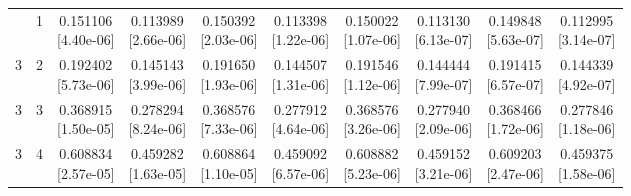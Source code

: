 \documentclass[12pt,letterpaper]{article}
\theoremstyle{plain}
\theoremstyle{definition}
\begin{document}
\begin{table}[p]
\begin{adjustbox}{max width=\linewidth}
\begin{tabular}{@{}rr*{8}{c}@{}}
\addlinespace[2pt]
3 & 1 & \shortstack{0.151106\\[-1pt]{\scriptsize[4.40e-06]}} & \shortstack{0.113989\\[-1pt]{\scriptsize[2.66e-06]}} & \shortstack{0.150392\\[-1pt]{\scriptsize[2.03e-06]}} & \shortstack{0.113398\\[-1pt]{\scriptsize[1.22e-06]}} & \shortstack{0.150022\\[-1pt]{\scriptsize[1.07e-06]}} & \shortstack{0.113130\\[-1pt]{\scriptsize[6.13e-07]}} & \shortstack{0.149848\\[-1pt]{\scriptsize[5.63e-07]}} & \shortstack{0.112995\\[-1pt]{\scriptsize[3.14e-07]}}\\
3 & 2 & \shortstack{0.192402\\[-1pt]{\scriptsize[5.73e-06]}} & \shortstack{0.145143\\[-1pt]{\scriptsize[3.99e-06]}} & \shortstack{0.191650\\[-1pt]{\scriptsize[1.93e-06]}} & \shortstack{0.144507\\[-1pt]{\scriptsize[1.31e-06]}} & \shortstack{0.191546\\[-1pt]{\scriptsize[1.12e-06]}} & \shortstack{0.144444\\[-1pt]{\scriptsize[7.99e-07]}} & \shortstack{0.191415\\[-1pt]{\scriptsize[6.57e-07]}} & \shortstack{0.144339\\[-1pt]{\scriptsize[4.92e-07]}}\\
3 & 3 & \shortstack{0.368915\\[-1pt]{\scriptsize[1.50e-05]}} & \shortstack{0.278294\\[-1pt]{\scriptsize[8.24e-06]}} & \shortstack{0.368576\\[-1pt]{\scriptsize[7.33e-06]}} & \shortstack{0.277912\\[-1pt]{\scriptsize[4.64e-06]}} & \shortstack{0.368576\\[-1pt]{\scriptsize[3.26e-06]}} & \shortstack{0.277940\\[-1pt]{\scriptsize[2.09e-06]}} & \shortstack{0.368466\\[-1pt]{\scriptsize[1.72e-06]}} & \shortstack{0.277846\\[-1pt]{\scriptsize[1.18e-06]}}\\
3 & 4 & \shortstack{0.608834\\[-1pt]{\scriptsize[2.57e-05]}} & \shortstack{0.459282\\[-1pt]{\scriptsize[1.63e-05]}} & \shortstack{0.608864\\[-1pt]{\scriptsize[1.10e-05]}} & \shortstack{0.459092\\[-1pt]{\scriptsize[6.57e-06]}} & \shortstack{0.608882\\[-1pt]{\scriptsize[5.23e-06]}} & \shortstack{0.459152\\[-1pt]{\scriptsize[3.21e-06]}} & \shortstack{0.609203\\[-1pt]{\scriptsize[2.47e-06]}} & \shortstack{0.459375\\[-1pt]{\scriptsize[1.58e-06]}}\\

\end{tabular}
\end{adjustbox}
\end{table}
\end{document}
